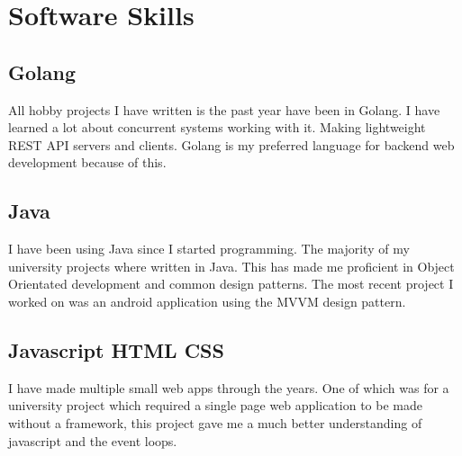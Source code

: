\documentclass[a4paper]{cv}
\begin{document}
\begin{minipage}[t]{0.30\textwidth}

\section{Software Skills}
\subsection{Golang}
\begin{flushleft}
All hobby projects I have written is the past year have been in Golang. I have learned a lot about concurrent systems working with it. Making lightweight REST API servers and clients. Golang is my preferred language for backend web development because of this.
\end{flushleft}
\sectionspace

\subsection{Java}
\begin{flushleft}
I have been using Java since I started programming. The majority of my university projects where written in Java. This has made me proficient in Object Orientated development and common design patterns. The most recent project I worked on was an android application using the MVVM design pattern.
\end{flushleft}

\sectionspace
\subsection{Javascript \textbullet{} HTML \textbullet{} CSS}
\begin{flushleft}
I have made multiple small web apps through the years. One of which was for a university project which required a single page web application to be made without a framework, this project gave me a much better understanding of javascript and the event loops.
\end{flushleft}

\end{minipage}
\hspace{0.2cm}
\end{document}
